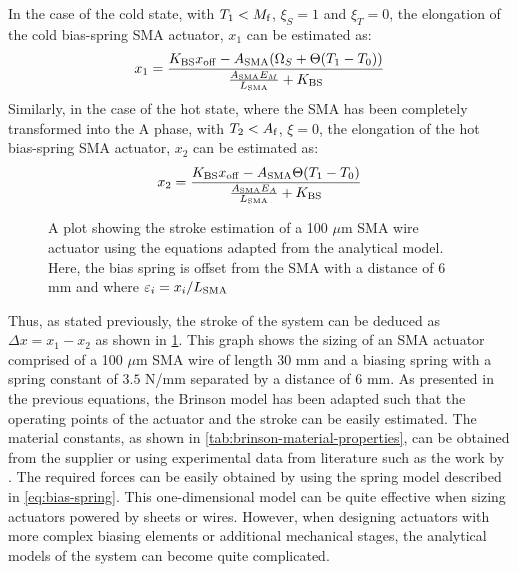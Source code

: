 In the case of the cold state, with $T_1 < M_\mathrm{f}$, $\xi_S=1$ and $\xi_T=0$, the elongation of the cold bias-spring SMA actuator, $x_1$ can be estimated as:
\begin{equation}
    \label{eq:bias-spring-sma-cold-elongation}
    x_1 = \frac{K_\mathrm{BS}x_\mathrm{off}-A_\mathrm{SMA}(\Omega_S+\Theta(T_1-T_0))}{\frac{A_\mathrm{SMA} E_M}{L_\mathrm{SMA}}+K_\mathrm{BS}}
\end{equation}
Similarly, in the case of the hot state, where the SMA has been completely transformed into the A phase, with $T_2 < A_\mathrm{f}$, $\xi=0$, the elongation of the hot bias-spring SMA actuator, $x_2$ can be estimated as:
\begin{equation}
    \label{eq:bias-spring-sma-hot-elongation}
    x_2 = \frac{K_\mathrm{BS}x_\mathrm{off}-A_\mathrm{SMA}\Theta(T_1-T_0)}{\frac{A_\mathrm{SMA} E_A}{L_\mathrm{SMA}}+K_\mathrm{BS}}
\end{equation}

\begin{figure}[hbt]
    \centering
    \resizebox{0.85\textwidth}{!}{}
    \caption[A plot showing the stroke estimation of a 100 $\mu$m SMA wire actuator using the equations adapted from the \cite{brinsonOneDimensionalConstitutiveBehavior1993} analytical model]{A plot showing the stroke estimation of a 100 $\mu$m SMA wire actuator using the equations adapted from the \cite{brinsonOneDimensionalConstitutiveBehavior1993} analytical model. Here, the bias spring is offset from the SMA with a distance of $6$ mm and where $\varepsilon_i = x_i / L_\mathrm{SMA}$ }
    \label{fig:brinson-sma-spring}
\end{figure}

Thus, as stated previously, the stroke of the system can be deduced as $\Delta x = x_1-x_2$ as shown in \cref{fig:brinson-sma-spring}. This graph shows the sizing of an SMA actuator comprised of a 100 $\mu$m SMA wire of length 30 mm and a biasing spring with a spring constant of $3.5$ N/mm separated by a distance of $6$ mm. As presented in the previous equations, the Brinson model has been adapted such that the operating points of the actuator and the stroke can be easily estimated. The material constants, as shown in \cref{tab:brinson-material-properties}, can be obtained from the supplier or using experimental data from literature such as the work by \cite{elahiniaEnhancedSMAPhenomenological2005}. The required forces can be easily obtained by using the spring model described in \cref{eq:bias-spring}. This one-dimensional model can be quite effective when sizing actuators powered by sheets or wires. However, when designing actuators with more complex biasing elements or additional mechanical stages, the analytical models of the system can become quite complicated.


